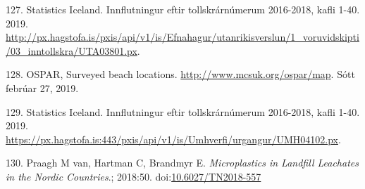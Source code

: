 \documentclass[icelandic,]{book}
\begin{document}
\leavevmode\hypertarget{ref-tollurinn}{}%
127. Statistics Iceland. Innflutningur eftir tollskrárnúmerum 2016-2018, kafli 1-40. 2019. \url{http://px.hagstofa.is/pxis/api/v1/is/Efnahagur/utanrikisverslun/1_voruvidskipti/03_inntollskra/UTA03801.px}.

\leavevmode\hypertarget{ref-ospar2019}{}%
128. OSPAR, Surveyed beach locations. \url{http://www.mcsuk.org/ospar/map}. Sótt febrúar 27, 2019.

\leavevmode\hypertarget{ref-tollurinn2}{}%
129. Statistics Iceland. Innflutningur eftir tollskrárnúmerum 2016-2018, kafli 1-40. 2019. \url{https://px.hagstofa.is:443/pxis/api/v1/is/Umhverfi/urgangur/UMH04102.px}.

\leavevmode\hypertarget{ref-Praagh1277395}{}%
130. Praagh M van, Hartman C, Brandmyr E. \emph{Microplastics in Landfill Leachates in the Nordic Countries}.; 2018:50. doi:\href{https://doi.org/10.6027/TN2018-557}{10.6027/TN2018-557}
\end{document}
